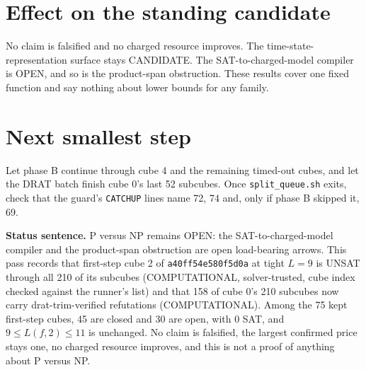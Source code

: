 \documentclass[11pt]{article}
\begin{document}
\section*{Effect on the standing candidate}
No claim is falsified and no charged resource improves. The time-state-representation surface stays CANDIDATE. The SAT-to-charged-model compiler is OPEN, and so is the product-span obstruction. These results cover one fixed function and say nothing about lower bounds for any family.

\section*{Next smallest step}
Let phase B continue through cube 4 and the remaining timed-out cubes, and let the DRAT batch finish cube 0's last 52 subcubes. Once \texttt{split\_queue.sh} exits, check that the guard's \texttt{CATCHUP} lines name 72, 74 and, only if phase B skipped it, 69.

\bigskip
\noindent\textbf{Status sentence.} P versus NP remains OPEN: the SAT-to-charged-model compiler and the product-span obstruction are open load-bearing arrows. This pass records that first-step cube 2 of \texttt{a40ff54e580f5d0a} at tight $L=9$ is UNSAT through all 210 of its subcubes (COMPUTATIONAL, solver-trusted, cube index checked against the runner's list) and that 158 of cube 0's 210 subcubes now carry drat-trim-verified refutations (COMPUTATIONAL). Among the 75 kept first-step cubes, 45 are closed and 30 are open, with 0 SAT, and $9\le L(f,2)\le 11$ is unchanged. No claim is falsified, the largest confirmed price stays one, no charged resource improves, and this is not a proof of anything about P versus NP.
\end{document}
